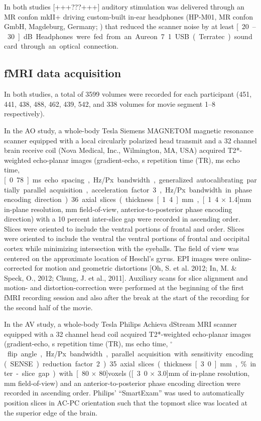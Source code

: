 \documentclass[english]{article}
\begin{document}
In both studies [+++???+++] auditory stimulation was delivered through an MR confon mkII+ driving custom-built in-ear headphones (HP-M01, MR confon GmbH, Magdeburg, Germany; \citep{baumgart1998electrodynamic}) that reduced the scanner noise by at least \unit[20–30]{dB}.
Headphones were  fed from an Aureon 7.1 USB (Terratec) sound card through an optical connection.


\subsection{fMRI data acquisition}


In both studies, a total of 3599 volumes were recorded for each participant
(451, 441, 438, 488, 462, 439, 542, and 338 volumes for movie segment 1–8
respectively).

In the AO study, a whole-body \unit[7]{Tesla} Siemens MAGNETOM magnetic
resonance scanner equipped with a local circularly polarized head transmit and a
32 channel brain receive coil (Nova Medical, Inc., Wilmington, MA, USA) acquired
T2*-weighted echo-planar images (gradient-echo, \unit[2]{s} repetition time
(TR), \unit[22]{ms} echo time, \unit[0.78]{ms} echo spacing, \unit[1488]{Hz/Px}
bandwidth, generalized autocalibrating partially parallel acquisition,
acceleration factor 3, \unit[2]{Hz/Px} bandwidth in phase encoding direction).
36 axial slices (thickness \unit[1.4]{mm}, \unit[1.4 $\times$ 1.4]{mm} in-plane
resolution, \unit[224]{mm} field-of-view, anterior-to-posterior phase encoding
direction) with a 10 percent inter-slice gap were recorded in ascending order.
Slices were oriented to include the ventral portions of frontal and order.
Slices were oriented to include the ventral the ventral portions of frontal and
occipital cortex while minimizing intersection with the eyeballs.  The field of
view was centered on the approximate location of Heschl's gyrus.
EPI images were online-corrected for motion and geometric distortions [Oh, S. et
al. 2012; In, M. \& Speck, O., 2012; Chung, J. et al., 2011]. Auxiliary scans
for slice alignment and motion- and distortion-correction were performed at the
beginning of the first fMRI recording session and also after the break at the
start of the recording for the second half of the movie.

In the AV study, a whole-body \unit[3]{Tesla} Philips Achieva dStream MRI
scanner equipped with a 32 channel head coil acquired T2*-weighted echo-planar
images (gradient-echo, \unit[2]{s} repetition time (TR), \unit[30]{ms} echo
time, \unit[90]{$^{\circ}$} flip angle, \unit[1943]{Hz/Px} bandwidth, parallel
acquisition with sensitivity encoding (SENSE) reduction factor 2).
35 axial slices (thickness \unit[3.0]{mm}, \unit[10]{\%} inter-slice gap) with
\unit[80 $\times$ 80]{voxels} (\unit[3.0 $\times$ 3.0]{mm} of in-plane
resolution, \unit[240]{mm} field-of-view) and an anterior-to-posterior phase
encoding direction were recorded in ascending order. Philips' ``SmartExam'' was
used to automatically position slices in AC-PC orientation such that the topmost
slice was located at the superior edge of the brain.
\end{document}
